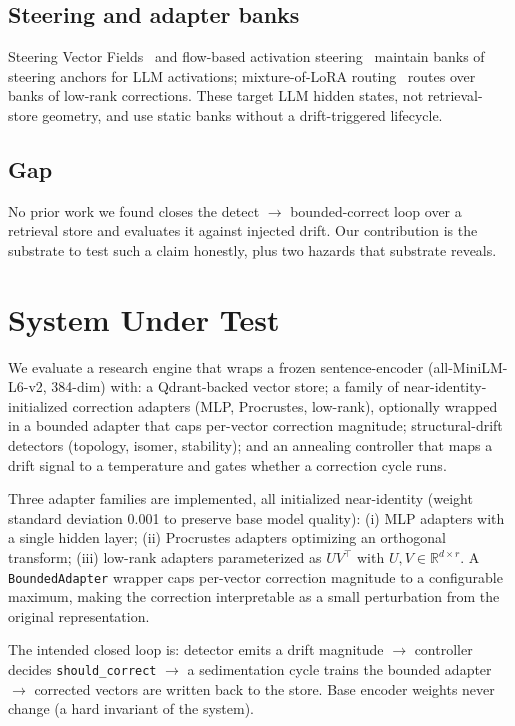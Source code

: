 \documentclass[12pt]{article}
\begin{document}
\subsection{Steering and adapter banks}
\label{sec:related-steering}

Steering Vector Fields~\cite{steeringvf2026} and flow-based activation steering~\cite{flowsteering2026} maintain banks of steering anchors for LLM activations; mixture-of-LoRA routing~\cite{ldmole2024,queryablelora2026} routes over banks of low-rank corrections. These target LLM hidden states, not retrieval-store geometry, and use static banks without a drift-triggered lifecycle.

\subsection{Gap}
\label{sec:related-gap}

No prior work we found closes the detect $\to$ bounded-correct loop over a retrieval store and evaluates it against injected drift. Our contribution is the substrate to test such a claim honestly, plus two hazards that substrate reveals.

\section{System Under Test}
\label{sec:sut}

We evaluate a research engine that wraps a frozen sentence-encoder (all-MiniLM-L6-v2, 384-dim) with: a Qdrant-backed vector store; a family of near-identity-initialized correction adapters (MLP, Procrustes, low-rank), optionally wrapped in a bounded adapter that caps per-vector correction magnitude; structural-drift detectors (topology, isomer, stability); and an annealing controller that maps a drift signal to a temperature and gates whether a correction cycle runs.

Three adapter families are implemented, all initialized near-identity (weight standard deviation 0.001 to preserve base model quality): (i) MLP adapters with a single hidden layer; (ii) Procrustes adapters optimizing an orthogonal transform; (iii) low-rank adapters parameterized as $UV^\top$ with $U, V \in \mathbb{R}^{d \times r}$. A \texttt{BoundedAdapter} wrapper caps per-vector correction magnitude to a configurable maximum, making the correction interpretable as a small perturbation from the original representation.

The intended closed loop is: detector emits a drift magnitude $\to$ controller decides \texttt{should\_correct} $\to$ a sedimentation cycle trains the bounded adapter $\to$ corrected vectors are written back to the store. Base encoder weights never change (a hard invariant of the system).
\end{document}
